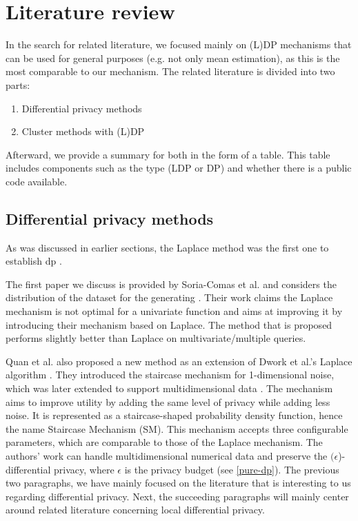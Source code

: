 \section{Literature review} \label{theory:literature-review}
In the search for related literature, we focused mainly on (L)DP mechanisms that can be used for general purposes (e.g. not only mean estimation), as this is the most comparable to our mechanism.
The related literature is divided into two parts:
\begin{enumerate}
  \item Differential privacy methods
  \item Cluster methods with (L)DP
\end{enumerate}
Afterward, we provide a summary for both in the form of a table.
This table includes components such as the type (LDP or DP) and whether there is a public code available.


\subsection{Differential privacy methods}
As was discussed in earlier sections, the Laplace method was the first one to establish \gls{dp} \citep{dwork_differential_2006}.

The first paper we discuss is provided by Soria-Comas et al. and considers the distribution of the dataset for the generating \citep{soria-comas_optimal_2013}.
Their work claims the Laplace mechanism is not optimal for a univariate function and aims at improving it by introducing their mechanism based on Laplace.
The method that is proposed performs slightly better than Laplace on multivariate/multiple queries.

Quan et al. also proposed a new method as an extension of Dwork et al.'s Laplace algorithm \citep{geng_staircase_2015}.
They introduced the staircase mechanism for 1-dimensional noise, which was later extended to support multidimensional data \citep{geng_staircase_2015}.
The mechanism aims to improve utility by adding the same level of privacy while adding less noise.
It is represented as a staircase-shaped probability density function, hence the name Staircase Mechanism (SM).
This mechanism accepts three configurable parameters, which are comparable to those of the Laplace mechanism.
The authors' work can handle multidimensional numerical data and preserve the  $(\epsilon$)-differential privacy, where $\epsilon$ is the privacy budget (see \ref{pure-dp}).
The previous two paragraphs, we have mainly focused on the literature that is interesting to us regarding differential privacy.
Next, the succeeding paragraphs will mainly center around related literature concerning local differential privacy.

